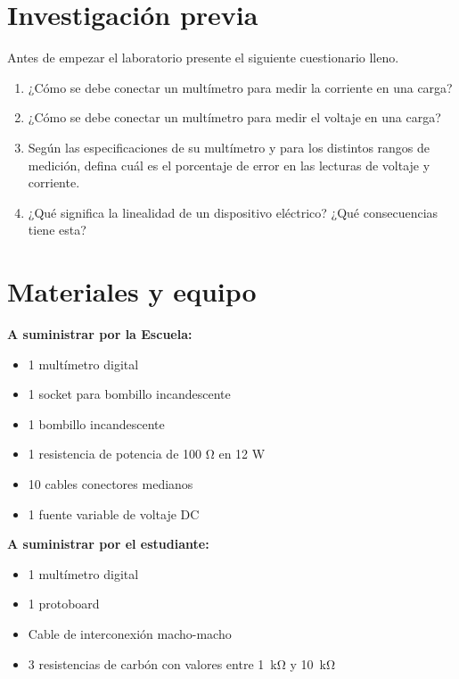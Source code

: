 \documentclass[12pt,letterpaper]{article}
\newcommand{\inv}{Investigación previa}
\newcommand{\mat}{Materiales y equipo}
\newcommand{\antesde}{Antes de empezar el laboratorio presente el siguiente cuestionario lleno.}
\begin{document}
\section{\inv}
\antesde
\begin{enumerate}
\item	¿Cómo se debe conectar un multímetro para medir la corriente en una carga? 
\item	¿Cómo se debe conectar un multímetro para medir el voltaje en una carga?
\item	Según las especificaciones de su multímetro y para los distintos rangos de medición, defina cuál es el porcentaje de error en las lecturas de voltaje y corriente.
\item	¿Qué significa la linealidad de un dispositivo eléctrico? ¿Qué consecuencias tiene esta?
\end{enumerate}

\section{\mat}
\textbf{A suministrar por la Escuela:}
\begin{itemize}
\item 1 multímetro digital
\item 1 socket para bombillo incandescente
\item 1 bombillo incandescente
\item 1 resistencia de potencia de 100 \si{\ohm} en 12 \si{\watt}
\item 10 cables conectores medianos
\item 1 fuente variable de voltaje DC
\end{itemize}
\textbf{A suministrar por el estudiante:}
\begin{itemize}
\item 1 multímetro digital
\item 1 protoboard
\item Cable de interconexión macho-macho
\item 3 resistencias de carbón con valores entre \SI{1}{\kilo\ohm} y \SI{10}{\kilo\ohm}
\end{itemize}
\end{document}

